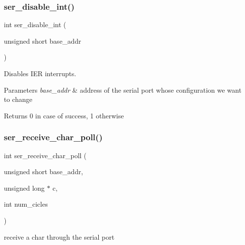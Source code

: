 \subsubsection{\texorpdfstring{ser\+\_\+disable\+\_\+int()}{ser\_disable\_int()}}
{\footnotesize\ttfamily int ser\+\_\+disable\+\_\+int (\begin{DoxyParamCaption}\item[{unsigned short}]{base\+\_\+addr }\end{DoxyParamCaption})}



Disables I\+ER interrupts. 


\begin{DoxyParams}{Parameters}
{\em base\+\_\+addr} & address of the serial port whose configuration we want to change\\
\hline
\end{DoxyParams}
\begin{DoxyReturn}{Returns}
0 in case of success, 1 otherwise 
\end{DoxyReturn}
\hypertarget{group__ser__port_gae9c2959fb0c4f39b96c4621d985f5ed2}{}\label{group__ser__port_gae9c2959fb0c4f39b96c4621d985f5ed2} 
\subsubsection{\texorpdfstring{ser\+\_\+receive\+\_\+char\+\_\+poll()}{ser\_receive\_char\_poll()}}
{\footnotesize\ttfamily int ser\+\_\+receive\+\_\+char\+\_\+poll (\begin{DoxyParamCaption}\item[{unsigned short}]{base\+\_\+addr,  }\item[{unsigned long $\ast$}]{c,  }\item[{int}]{num\+\_\+cicles }\end{DoxyParamCaption})}



receive a char through the serial port 


